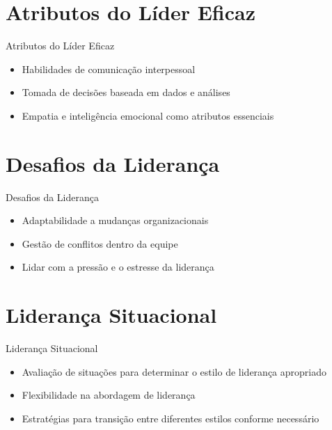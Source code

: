 \documentclass[aspectratio=169,xcolor=dvipsnames]{beamer}
\begin{document}
\section{Atributos do Líder Eficaz}

\begin{frame}{Atributos do Líder Eficaz}
	\begin{itemize}
		\item Habilidades de comunicação interpessoal
		\item Tomada de decisões baseada em dados e análises
		\item Empatia e inteligência emocional como atributos essenciais

	\end{itemize}
\end{frame}

\section{Desafios da Liderança}

\begin{frame}{Desafios da Liderança}
	\begin{itemize}
		\item Adaptabilidade a mudanças organizacionais
		\item Gestão de conflitos dentro da equipe
		\item Lidar com a pressão e o estresse da liderança

	\end{itemize}
\end{frame}

\section{Liderança Situacional}

\begin{frame}{Liderança Situacional}
	\begin{itemize}
		\item Avaliação de situações para determinar o estilo de liderança apropriado
		\item Flexibilidade na abordagem de liderança
		\item Estratégias para transição entre diferentes estilos conforme necessário

	\end{itemize}
\end{frame}
\end{document}
